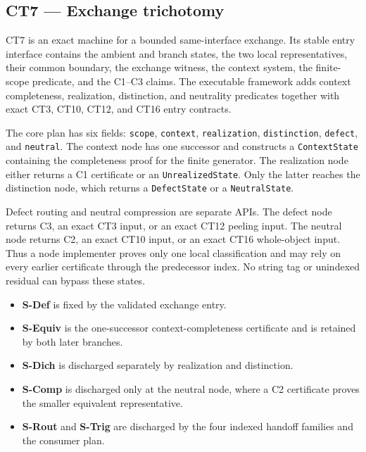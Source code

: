 \subsection{CT7 --- Exchange trichotomy}\label{ct:7}\label{the-exchange-trichotomy}

CT7 is an exact machine for a bounded same-interface exchange.  Its stable
entry interface contains the ambient and branch states, the two local
representatives, their common boundary, the exchange witness, the context
system, the finite-scope predicate, and the C1--C3 claims.  The executable
framework adds context completeness, realization, distinction, and neutrality
predicates together with exact CT3, CT10, CT12, and CT16 entry contracts.

The core plan has six fields: \texttt{scope}, \texttt{context},
\texttt{realization}, \texttt{distinction}, \texttt{defect}, and
\texttt{neutral}.  The context node has one successor and constructs a
\texttt{ContextState} containing the completeness proof for the finite
generator.  The realization node either returns a C1 certificate or an
\texttt{UnrealizedState}.  Only the latter reaches the distinction node,
which returns a \texttt{DefectState} or a \texttt{NeutralState}.

Defect routing and neutral compression are separate APIs.  The defect node
returns C3, an exact CT3 input, or an exact CT12 peeling input.  The neutral node
returns C2, an exact CT10 input, or an exact CT16 whole-object input.  Thus a node
implementer proves only one local classification and may rely on every earlier
certificate through the predecessor index.  No string tag or unindexed
residual can bypass these states.

\begin{itemize}
\tightlist
\item \textbf{S-Def} is fixed by the validated exchange entry.
\item \textbf{S-Equiv} is the one-successor context-completeness certificate and is retained by both later branches.
\item \textbf{S-Dich} is discharged separately by realization and distinction.
\item \textbf{S-Comp} is discharged only at the neutral node, where a C2 certificate proves the smaller equivalent representative.
\item \textbf{S-Rout} and \textbf{S-Trig} are discharged by the four indexed handoff families and the consumer plan.
\end{itemize}

